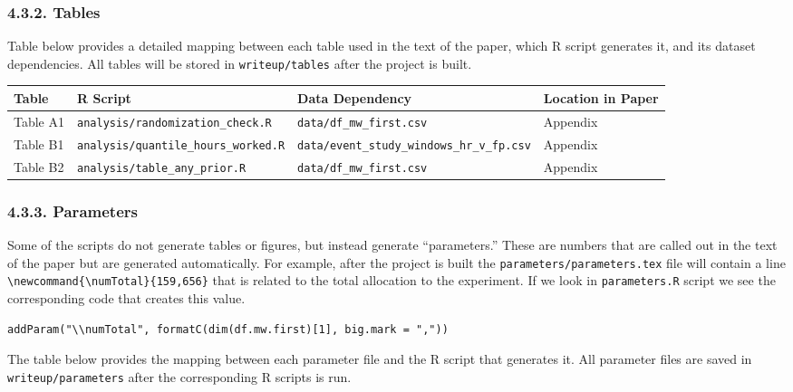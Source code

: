 \documentclass[10pt]{article}
\newenvironment{eightpt}{\begingroup\fontsize{8}{13}\selectfont}{\endgroup}
\begin{document}
\subsubsection*{4.3.2. Tables}

Table below provides a detailed mapping between each table used in the text of the paper, which R script generates it, and its dataset dependencies. 
All tables will be stored in \texttt{writeup/tables} after the project is built.

\begin{eightpt}
\begin{tabularx}{\textwidth}{@{}p{}p{}p{}>{\centering\arraybackslash}p{}@{}}
\toprule
Table & R Script & Data Dependency & Location in Paper \\
\midrule
Table A1 & \texttt{analysis/randomization\_check.R} & \texttt{data/df\_mw\_first.csv} & Appendix \\
Table B1 & \texttt{analysis/quantile\_hours\_worked.R} & \texttt{data/event\_study\_windows\_hr\_v\_fp.csv} & Appendix \\
Table B2 & \texttt{analysis/table\_any\_prior.R} & \texttt{data/df\_mw\_first.csv} & Appendix \\
\bottomrule
\end{tabularx}
\end{eightpt}

\subsubsection*{4.3.3. Parameters}

Some of the scripts do not generate tables or figures, but instead generate ``parameters.''
These are numbers that are called out in the text of the paper but are generated automatically. 
For example, after the project is built the \texttt{parameters/parameters.tex} file will contain a line 
\verb|\newcommand{\numTotal}{159,656}| that is related to the total allocation to the experiment.
If we look in \texttt{parameters.R} script we see the corresponding code that creates this value.

\begin{verbatim}
addParam("\\numTotal", formatC(dim(df.mw.first)[1], big.mark = ","))
\end{verbatim}

The table below provides the mapping between each parameter file and the R script that generates it. 
All parameter files are saved in \texttt{writeup/parameters} after the corresponding R scripts is run.
\end{document}
